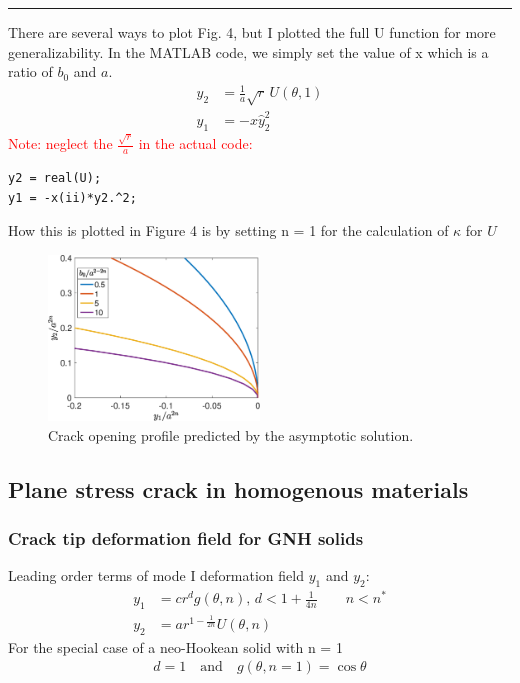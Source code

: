 \documentclass[12pt,3p]{article}
\numberwithin{equation}{section}
\begin{document}
\noindent\rule{\linewidth}{0.5pt} %
There are several ways to plot Fig. 4, but I plotted the full U function for more generalizability. In the MATLAB code, we simply set the value of x which is a ratio of $b_0$ and $a$. 
\begin{align*}
\hat{y}_2 &= \frac{1}{a} \sqrt{r} \, U (\theta, 1) \\
\hat{y}_1 &= -x \hat{y}_2^2
\end{align*}
\textcolor{red}{Note: neglect the $\frac{\sqrt{r}}{a}$ in the actual code:}
\begin{lstlisting}
y2 = real(U);
y1 = -x(ii)*y2.^2;
\end{lstlisting}
How this is plotted in Figure 4 is by setting n = 1 for the calculation of $\kappa$ for $U$
\begin{figure}[h!]
	\centering
        \includegraphics[width=0.5\textwidth]{Fig4A.eps}
        \caption{Crack opening profile predicted by the asymptotic solution.}
\end{figure}

\subsection{Plane stress crack in homogenous materials}

\subsubsection{Crack tip deformation field for GNH solids}
Leading order terms of mode I deformation field $y_1$ and $y_2$: 
\begin{align}
y_1 &= c r^d g (\theta, n), \, d < 1 + \frac{1}{4n} \quad \quad n < n^* \\
y_2 &= a r^{1-\frac{1}{2n}} U(\theta, n)
\end{align}
For the special case of a neo-Hookean solid with n = 1 
\begin{align}
d = 1 \quad \text{and} \quad g(\theta, n = 1) = \cos \theta
\end{align}
\end{document}
